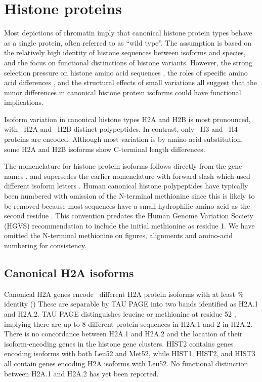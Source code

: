 \section{Histone proteins}
  Most depictions of chromatin imply that
  canonical histone protein types behave as a single protein,
  often referred to as ``wild type''.
  The assumption is based on the relatively high identity of histone sequences
  between isoforms and species,
  and the focus on functional distinctions of histone variants.
  However, the strong selection pressure on histone amino acid
  sequences \citep{birth-death-review},
  the roles of specific amino acid differences \citep{MazeAllis2014},
  and the structural effects of small variations \citep{KurumizakaCOSB2013}
  all suggest that the minor differences in canonical histone protein isoforms
  could have functional implications.

  Isoform variation in canonical histone types H2A and H2B is most pronounced,
  with \HTwoAUniqueProteins{}~H2A and \HTwoBUniqueProteins{}~H2B distinct polypeptides.
  In contrast, only \HThreeUniqueProteins{}~H3 and \HFourUniqueProteins{}~H4 proteins
  are encoded. Although most variation is by amino acid substitution, 
  some H2A and H2B isoforms show C-terminal length differences.

  The nomenclature for histone protein isoforms follows directly
  from the gene names \citep{Marzluff02},
  and supersedes the earlier nomenclature with forward slash which used different isoform letters
  \citep{AlbigGenomics1997,AlbigHumangen1997}.
  Human canonical histone polypeptides have typically been numbered
  with omission of the N-terminal methionine
  since this is likely to be removed because most sequences have
  a small hydrophilic amino acid as the second residue \citep{XiaoPeiBiochem2010}.
  This convention predates the Human Genome Variation Society (HGVS) recommendation
  to include the initial methionine as residue 1.
  We have omitted the N-terminal methionine on figures, alignments 
  and amino-acid numbering for consistency.
  

  \subsection{Canonical H2A isoforms}
    Canonical H2A genes encode \HTwoAUniqueProteins{}~different H2A
    protein isoforms with at least \result\% identity ()
    These are separable by TAU PAGE into two bands identified as H2A.1 and H2A.2.
    TAU PAGE distinguishes leucine or methionine at
    residue 52 \citep{FranklinZweidler1977,Zweidler1977},
    implying there are up to 8 different protein sequences in H2A.1 and 2 in H2A.2.
    There is no concordance between H2A.1 and H2A.2
    and the location of their isoform-encoding genes in the histone gene clusters.
    HIST2 contains genes encoding isoforms with both Leu52 and Met52,
    while HIST1, HIST2, and HIST3 all contain genes encoding H2A isoforms with Leu52.
    No functional distinction between H2A.1 and H2A.2 has yet been reported.

